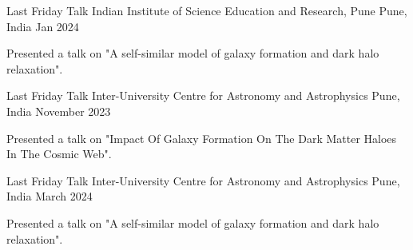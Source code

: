 \begin{cventries}

{
\cventry
{Last Friday Talk}
{Indian Institute of Science Education and Research, Pune}
{Pune, India}
{Jan 2024}
{
\begin{cvitems}
\item {Presented a talk on "A self-similar model of galaxy 
formation and dark halo relaxation".}
\end{cvitems}
}
}

{
\cventry
{Last Friday Talk}
{Inter-University Centre for Astronomy and Astrophysics}
{Pune, India}
{November 2023}
{
\begin{cvitems}
\item {Presented a talk on "Impact Of Galaxy Formation On The Dark Matter Haloes In The Cosmic Web".}
\end{cvitems}
}
}

{
\cventry
{Last Friday Talk}
{Inter-University Centre for Astronomy and Astrophysics}
{Pune, India}
{March 2024}
{
\begin{cvitems}
\item {Presented a talk on "A self-similar model of galaxy 
formation and dark halo relaxation".}
\end{cvitems}
}
}

\end{cventries}